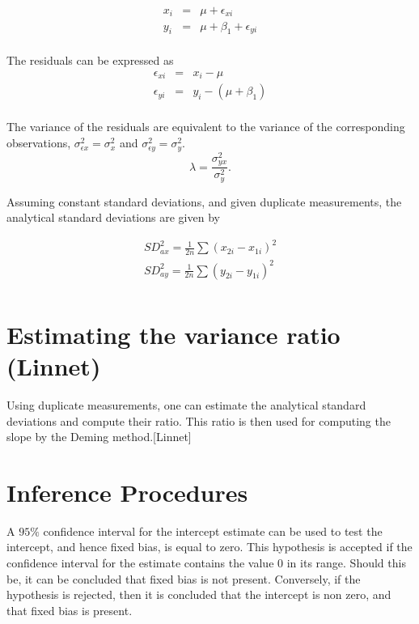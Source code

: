 \documentclass[12pt, a4paper]{report}
\theoremstyle{plain}
\theoremstyle{definition}
\theoremstyle{remark}
\begin{document}
\begin{eqnarray*}
	x_{i} &=& \mu + \epsilon_{xi}\\
	y_{i} &=& \mu +  \beta_{1} + \epsilon_{yi}\\
\end{eqnarray*}

The residuals can be expressed as
\begin{eqnarray*}
	\epsilon_{xi} &=& x_{i} - \mu  \\
	\epsilon_{yi} &=& y_{i} - (\mu + \beta_{1}) \\
\end{eqnarray*}

The variance of the residuals are equivalent to the variance of the corresponding observations, $\sigma^{2}_{\epsilon x} =
\sigma^{2}_{x}$ and $\sigma^{2}_{\epsilon y} = \sigma^{2}_{y}$.
\begin{equation}
\lambda = \frac{\sigma^{2}_{yx}}{\sigma^{2}_{y}}.
\end{equation}

Assuming constant standard deviations, and given duplicate measurements, the analytical standard deviations are given by

\begin{eqnarray*}
	SD^{2}_{ax} = \frac{1}{2n} \sum (x_{2i} - x_{1i})^{2}\\
	SD^{2}_{ay} = \frac{1}{2n} \sum (y_{2i} - y_{1i})^{2}\\
\end{eqnarray*}



\section{Estimating the variance ratio (Linnet)}

Using duplicate measurements, one can estimate the analytical standard deviations and compute their ratio. This ratio is then used for computing the slope by the Deming method.[Linnet]



\section{Inference Procedures}
A $95\%$ confidence interval for the intercept estimate can be used to test the intercept, and hence fixed bias, is equal to
zero. This hypothesis is accepted if the confidence interval for the estimate contains the value $0$ in its range. Should this be,
it can be concluded that fixed bias is not present. Conversely, if the hypothesis is rejected, then it is concluded that the
intercept is non zero, and that fixed bias is present.
\end{document}
